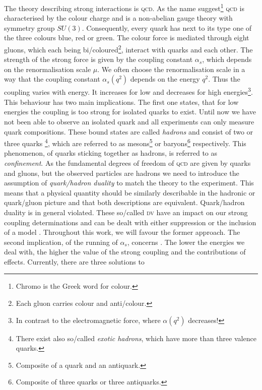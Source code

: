 \documentclass[../../index.tex]{subfiles}
\begin{document}
The theory describing strong interactions is \textsc{qcd}. As the name
suggest\footnote{Chromo is the Greek word for colour.} \textsc{qcd} is
characterised by the colour charge and is a non-abelian gauge theory with
symmetry group \(SU(3)\). Consequently, every quark has next to its type one of
the three colours blue, red or green. The colour force is mediated through eight
gluons, which each being bi\-/coloured\footnote{Each gluon carries colour and
  anti\-/colour.}, interact with quarks and each other. The strength of the
strong force is given by the coupling constant \(\alpha_s\), which depends on
the renormalisation scale \(\mu\). We often choose the renormalisation scale in
a way that the coupling constant \(\alpha_s(q^2)\) depends on the energy
\(q^2\). Thus the coupling varies with energy. It increases for low and
decreases for high energies\footnote{In contrast to the electromagnetic force,
  where \(\alpha(q^2)\) decreases!}. This behaviour has two main implications.
The first one states, that for low energies the coupling is too strong for
isolated quarks to exist. Until now we have not been able to observe an isolated
quark and all experiments can only measure quark compositions. These bound
states are called \textit{hadrons} and consist of two or three quarks
\footnote{There exist also so\-/called \textit{exotic hadrons}, which have more
  than three valence quarks.}, which are referred to as
mesons\footnote{Composite of a quark and an antiquark.} or
baryons\footnote{Composite of three quarks or three antiquarks.}
respectively. This phenomenon, of quarks sticking together as hadrons, is
referred to as \textit{confinement}. As the fundamental degrees of freedom of
\textsc{qcd} are given by quarks and gluons, but the observed particles are
hadrons we need to introduce the assumption of \textit{quark\-/hadron duality}
to match the theory to the experiment. This means that a physical quantity
should be similarly describable in the hadronic or quark\-/gluon picture and
that both descriptions are equivalent. Quark\-/hadron duality is in general
violated. These so\-/called \textsc{dv} have an impact on our strong coupling
determinations and can be dealt with either suppression or the inclusion of a
model \cite{Cata2008}. Throughout this work, we will favour the former approach.
The second implication, of the running of \(\alpha_s\), concerns
. The lower the energies we deal with, the
higher the value of the strong coupling and the contributions of
 effects. Currently, there are three solutions to
\end{document}
